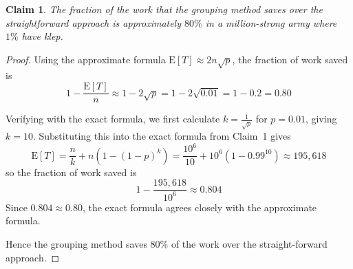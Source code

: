 \documentclass{article}
\newtheorem{claim}{Claim}
\begin{document}
\begin{claim}
    The fraction of the work that the grouping method saves over the straightforward approach is approximately 
    $80\%$ in a million-strong army where $1\%$ have klep.
\end{claim}

\begin{proof}
    Using the approximate formula $\mathrm{E}[T] \approx 2n\sqrt{p}$, the fraction of work saved is
    \[
    1 - \frac{\mathrm{E}[T]}{n} \approx 1 - 2\sqrt{p} = 1 - 2\sqrt{0.01} = 1 - 0.2 = 0.80
    \]

    \medskip

    Verifying with the exact formula, we first calculate $k = \frac{1}{\sqrt{p}}$ for $p = 0.01$, giving 
    $k = 10$. Substituting this into the exact formula from Claim~1 gives
    \[
    \mathrm{E}[T] = \frac{n}{k} + n\left(1-(1-p)^k\right) = \frac{10^6}{10} + 10^6\left(1-0.99^{10}\right) 
    \approx 195{,}618
    \]
    so the fraction of work saved is
    \[
    1 - \frac{195{,}618}{10^6} \approx 0.804
    \]
    Since $0.804 \approx 0.80$, the exact formula agrees closely with the approximate formula.

    \medskip

    Hence the grouping method saves $80\%$ of the work over the straight-forward approach.
\end{proof}
\end{document}
